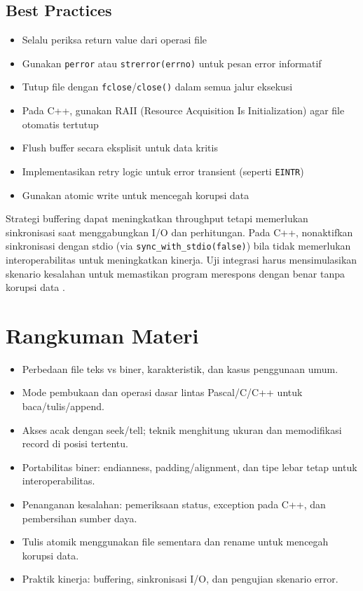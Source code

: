 \documentclass[../main.tex]{subfiles}
\begin{document}
\subsection{Best Practices}
\begin{itemize}
  \item Selalu periksa return value dari operasi file
  \item Gunakan \texttt{perror} atau \texttt{strerror(errno)} untuk pesan error informatif
  \item Tutup file dengan \texttt{fclose}/\texttt{close()} dalam semua jalur eksekusi
  \item Pada C++, gunakan RAII (Resource Acquisition Is Initialization) agar file otomatis tertutup
  \item Flush buffer secara eksplisit untuk data kritis
  \item Implementasikan retry logic untuk error transient (seperti \texttt{EINTR})
  \item Gunakan atomic write untuk mencegah korupsi data
\end{itemize}

Strategi buffering dapat meningkatkan throughput tetapi memerlukan sinkronisasi saat menggabungkan I/O dan perhitungan. Pada C++, nonaktifkan sinkronisasi dengan stdio (via \texttt{sync\_with\_stdio(false)}) bila tidak memerlukan interoperabilitas untuk meningkatkan kinerja. Uji integrasi harus mensimulasikan skenario kesalahan untuk memastikan program merespons dengan benar tanpa korupsi data \parencite{cplusplus-io,cpp-reference}.

\section{Rangkuman Materi}
\begin{itemize}
  \item Perbedaan file teks vs biner, karakteristik, dan kasus penggunaan umum.
  \item Mode pembukaan dan operasi dasar lintas Pascal/C/C++ untuk baca/tulis/append.
  \item Akses acak dengan seek/tell; teknik menghitung ukuran dan memodifikasi record di posisi tertentu.
  \item Portabilitas biner: endianness, padding/alignment, dan tipe lebar tetap untuk interoperabilitas.
  \item Penanganan kesalahan: pemeriksaan status, exception pada C++, dan pembersihan sumber daya.
  \item Tulis atomik menggunakan file sementara dan rename untuk mencegah korupsi data.
  \item Praktik kinerja: buffering, sinkronisasi I/O, dan pengujian skenario error.
\end{itemize}
\end{document}
